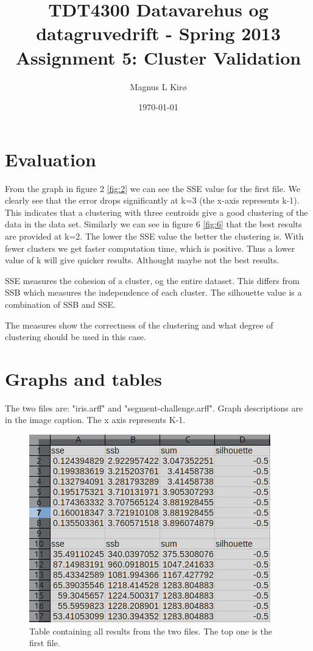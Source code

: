 \documentclass[12pt, a4paper]{article}
\title{TDT4300 Datavarehus og datagruvedrift - Spring 2013 \\ Assignment 5: Cluster Validation}
\author{
        Magnus L Kirø \\
}
\date{\today}
\begin{document}
\maketitle
{}

\section{Evaluation}
From the graph in figure 2 \ref{fig:2} we can see the SSE value for the first
file. We clearly see that the error drops significantly at k=3 (the x-axis
represents k-1). This indicates that a clustering with three centroids give a
good clustering of the data in the data set. Similarly we can see in figure 6 
\ref{fig:6} that the best results are provided at k=2. The lower the SSE value
the better the clustering is. With fewer clusters we get faster computation
time, which is positive. Thus a lower value of k will give quicker results.
Althought maybe not the best results. 

SSE measures the cohesion of a cluster, og the entire dataset. This differs
from SSB which measures the independence of each cluster.
The silhouette value is a combination of SSB and SSE. 

The measures show the correctness of the clustering and what degree of
clustering should be used in this case. 

\section{Graphs and tables}
The two files are: "iris.arff" and "segment-challenge.arff".
Graph descriptions are in the image caption.
The x axis represents K-1.
\begin{figure}[htb]
    \centering
    \includegraphics[width=\textwidth]{table}        
    \caption{Table containing all results from the two files. The top one is
the first file.}
    \label{fig:1}
\end{figure}
\end{document}
